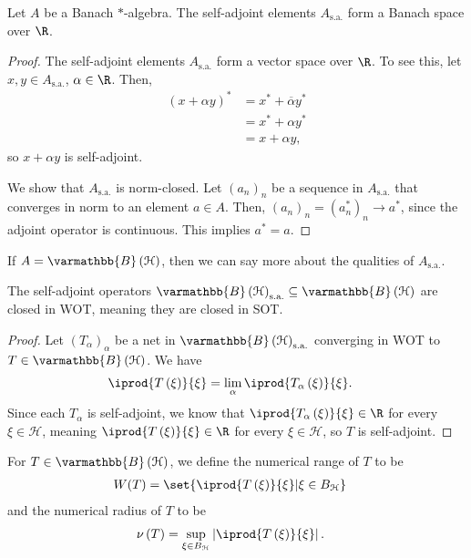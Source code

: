 \documentclass[10pt]{mypackage}
\renewcommand*{\mathbb}[1]{\varmathbb{#1}}
\newcommand{\sa}{\text{s.a.}}
\newcommand{\B}{\mathbb{B}}
\begin{document}
\begin{proposition}
  Let $A$ be a Banach $\ast$-algebra. The self-adjoint elements $A_{\sa}$ form a Banach space over $\R$.
\end{proposition}
\begin{proof}
  The self-adjoint elements $A_{\sa}$ form a vector space over $\R$. To see this, let $x,y\in A_{\sa}$, $\alpha\in \R$. Then,
  \begin{align*}
    \left(x + \alpha y\right)^{\ast} &= x^{\ast} + \overline{\alpha}y^{\ast}\\
                                     &= x^{\ast} + \alpha y^{\ast}\\
                                     &= x + \alpha y,
  \end{align*}
  so $x + \alpha y$ is self-adjoint.\newline

  We show that $A_{\sa}$ is norm-closed. Let $\left(a_n\right)_n$ be a sequence in $A_{\sa}$ that converges in norm to an element $a\in A$. Then, $\left(a_n\right)_n = \left(a_n^{\ast}\right)_n\rightarrow a^{\ast}$, since the adjoint operator is continuous. This implies $a^{\ast} = a$.
\end{proof}
If $A = \B\left(\mathcal{H}\right)$, then we can say more about the qualities of $A_{\sa}$.
\begin{proposition}
  The self-adjoint operators $\B\left(\mathcal{H}\right)_{\sa}\subseteq \B\left(\mathcal{H}\right)$ are closed in WOT, meaning they are closed in SOT.
\end{proposition}
\begin{proof}
  Let $\left(T_{\alpha}\right)_{\alpha}$ be a net in $\B\left(\mathcal{H}\right)_{\sa}$ converging in WOT to $T\in \B\left(\mathcal{H}\right)$. We have
  \begin{align*}
    \iprod{T\left(\xi\right)}{\xi} &= \lim_{\alpha} \iprod{T_{\alpha}\left(\xi\right)}{\xi}.
  \end{align*}
  Since each $T_{\alpha}$ is self-adjoint, we know that $ \iprod{T_{\alpha}\left(\xi\right)}{\xi}\in \R$ for every $\xi\in \mathcal{H}$, meaning $ \iprod{T\left(\xi\right)}{\xi}\in \R $ for every $\xi\in \mathcal{H}$, so $T$ is self-adjoint.
\end{proof}
\begin{definition}
  For $T\in \B\left(\mathcal{H}\right)$, we define the numerical range of $T$ to be
  \begin{align*}
    W(T) &= \set{ \iprod{T\left(\xi\right)}{\xi} | \xi\in B_{\mathcal{H}} }
  \end{align*}
  and the numerical radius of $T$ to be
  \begin{align*}
    \nu\left(T\right) &= \sup_{\xi \in B_{\mathcal{H}}} \left\vert \iprod{T\left(\xi\right)}{\xi} \right\vert.
  \end{align*}
\end{definition}
\end{document}
